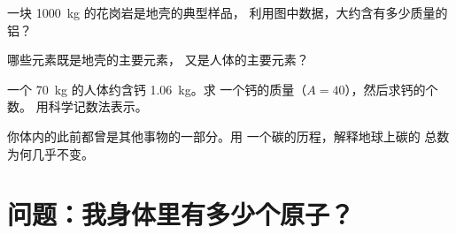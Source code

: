 \begin{exercise}[$\star\star$]\label{exo:g9:elements-universe-earth:9}
一块 \qty{1000}{kg} 的花岗岩是地壳的典型样品，
利用图中数据，大约含有多少质量的铝？
\end{exercise}

\begin{exercise}[$\star\star$]\label{exo:g9:elements-universe-earth:10}
哪些元素既是地壳的主要元素，
又是人体的主要元素？
\end{exercise}

\begin{exercise}[$\star\star\star$]\label{exo:g9:elements-universe-earth:11}
一个 \qty{70}{kg} 的人体约含钙 \qty{1.06}{kg}。求
一个钙的质量（$A = 40$），然后求钙的个数。
用科学记数法表示。
\end{exercise}

\begin{exercise}[$\star\star\star$]\label{exo:g9:elements-universe-earth:12}
你体内的此前都曾是其他事物的一部分。用
一个碳的历程，解释地球上碳的
总数为何几乎不变。
\end{exercise}

\section{问题：我身体里有多少个原子？}

